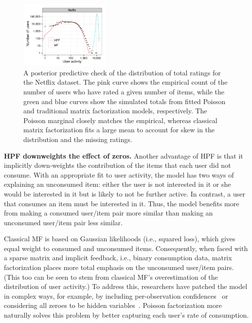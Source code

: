 \begin{figure}[t!]
  \centering
  \includegraphics[width=0.4\textwidth]{figures/user_activity_sim_netflix.pdf}
  \caption{A posterior predictive check of the distribution of total
    ratings for the Netflix dataset.  The pink curve shows the
    empirical count of the number of users who have rated a given
    number of items, while the green and blue curves show the
    simulated totals from fitted Poisson and traditional matrix
    factorization models, respectively. The Poisson marginal closely
    matches the empirical, whereas classical matrix factorization fits
    a large mean to account for skew in the distribution and the
    missing ratings.}
\label{fig:marginals}
\end{figure}

{\bf HPF downweights the effect of zeros.}  Another advantage of HPF
is that it implicitly down-weights the contribution of the items that
each user did not consume.  With an appropriate fit to user activity,
the model has two ways of explaining an unconsumed item: either the
user is not interested in it or she would be interested in it but is
likely to not be further active. In contrast, a user that consumes an
item must be interested in it.  Thus, the model benefits more from
making a consumed user/item pair more similar than making an
unconsumed user/item pair less similar.

Classical MF is based on Gaussian likelihoods (i.e., squared loss),
which gives equal weight to consumed and unconsumed items.
Consequently, when faced with a sparse matrix and implicit feedback,
i.e., binary consumption data, matrix factorization places more total
emphasis on the unconsumed user/item pairs.  (This too can be seen to
stem from classical MF's overestimation of the distribution of user
activity.)  To address this, researchers have patched the model in
complex ways, for example, by including per-observation
confidences~\cite{Koren:2009} or considering all zeroes to be hidden
variables~\cite{Paquet:2013p9197}.  Poisson factorization more
naturally solves this problem by better capturing each user's rate of
consumption.

